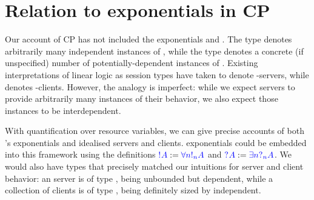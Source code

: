 \section{Relation to exponentials in CP}
Our account of CP has not included the exponentials  and .
The type  denotes arbitrarily many independent instances of , while
the type  denotes a concrete (if unspecified) number of
potentially-dependent instances of .  Existing interpretations of linear
logic as session types have taken  to denote -servers, while
 denotes -clients.  However, the analogy is imperfect: while we
expect servers to provide arbitrarily many instances of their behavior, we also
expect those instances to be interdependent.

With quantification over resource variables, we can give precise accounts
of both \cp's exponentials and idealised servers and clients.
\cp exponentials could be embedded into this framework using the definitions
$\ty{\take{A}} := \ty{\forall{n}\take[n]{A}}$ and $\ty{\give{A}} :=
\ty{\exists{n}{\give[n]{A}}}$.
We would also have types that precisely matched our intuitions for server and
client behavior: an  server is of type , being
unbounded but dependent, while a collection of  clients is of type
, being definitely sized by independent.

